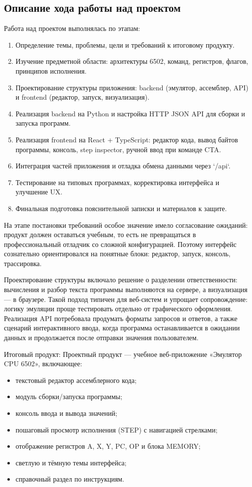 \documentclass[12pt,a4paper]{article}
\begin{document}
\subsection{Описание хода работы над проектом}
Работа над проектом выполнялась по этапам:
\begin{enumerate}
  \item Определение темы, проблемы, цели и требований к итоговому продукту.
  \item Изучение предметной области: архитектуры 6502, команд, регистров, флагов, принципов исполнения.
  \item Проектирование структуры приложения: backend (эмулятор, ассемблер, API) и frontend (редактор, запуск, визуализация).
  \item Реализация backend на Python и настройка HTTP JSON API для сборки и запуска программ.
  \item Реализация frontend на React + TypeScript: редактор кода, вывод байтов программы, консоль, step inspector, ручной ввод при команде CTA.
  \item Интеграция частей приложения и отладка обмена данными через `/api`.
  \item Тестирование на типовых программах, корректировка интерфейса и улучшение UX.
  \item Финальная подготовка пояснительной записки и материалов к защите.
\end{enumerate}

На этапе постановки требований особое значение имело согласование ожиданий: продукт должен оставаться учебным, то есть не превращаться в профессиональный отладчик со сложной конфигурацией. Поэтому интерфейс сознательно ориентировался на понятные блоки: редактор, запуск, консоль, трассировка.

Проектирование структуры включало решение о разделении ответственности: вычисления и разбор текста программы выполняются на сервере, а визуализация --- в браузере. Такой подход типичен для веб-систем и упрощает сопровождение: логику эмуляции проще тестировать отдельно от графического оформления. Реализация API потребовала продумать форматы запросов и ответов, а также сценарий интерактивного ввода, когда программа останавливается в ожидании данных и продолжается после отправки значения пользователем.


Итоговый продукт:
Проектный продукт --- учебное веб-приложение «Эмулятор CPU 6502», включающее:
\begin{itemize}
  \item текстовый редактор ассемблерного кода;
  \item модуль сборки/запуска программы;
  \item консоль ввода и вывода значений;
  \item пошаговый просмотр исполнения (STEP) с навигацией стрелками;
  \item отображение регистров A, X, Y, PC, OP и блока MEMORY;
  \item светлую и тёмную темы интерфейса;
  \item справочный раздел по инструкциям.
\end{itemize}
\end{document}
